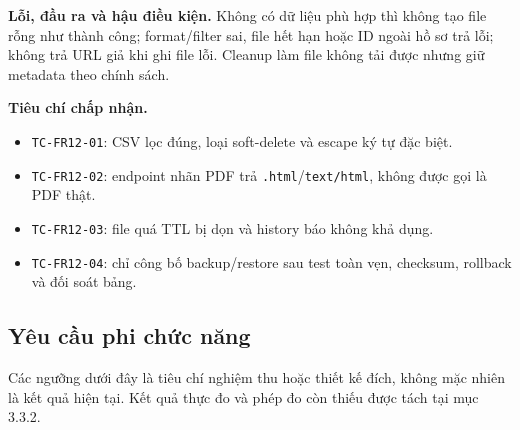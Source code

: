 \textbf{Lỗi, đầu ra và hậu điều kiện.} Không có dữ liệu phù hợp thì không tạo file rỗng như thành công; format/filter sai, file hết hạn hoặc ID ngoài hồ sơ trả lỗi; không trả URL giả khi ghi file lỗi. Cleanup làm file không tải được nhưng giữ metadata theo chính sách.

\textbf{Tiêu chí chấp nhận.}
\begin{itemize}
  \item \texttt{TC-FR12-01}: CSV lọc đúng, loại soft-delete và escape ký tự đặc biệt.
  \item \texttt{TC-FR12-02}: endpoint nhãn PDF trả \texttt{.html}/\texttt{text/html}, không được gọi là PDF thật.
  \item \texttt{TC-FR12-03}: file quá TTL bị dọn và history báo không khả dụng.
  \item \texttt{TC-FR12-04}: chỉ công bố backup/restore sau test toàn vẹn, checksum, rollback và đối soát bảng.
\end{itemize}

\subsection{Yêu cầu phi chức năng}

Các ngưỡng dưới đây là tiêu chí nghiệm thu hoặc thiết kế đích, không mặc nhiên là kết quả hiện tại. Kết quả thực đo và phép đo còn thiếu được tách tại mục 3.3.2.

